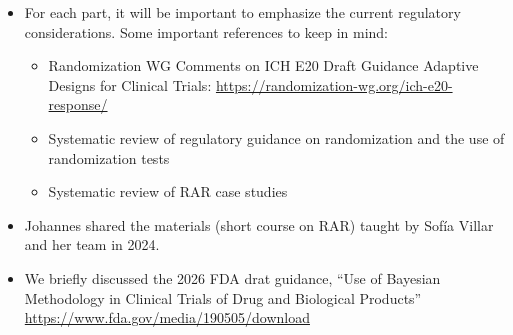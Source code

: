 \documentclass[12pt]{article}
\begin{document}
\begin{itemize}
\begin{itemize}
        \item Johannes and Yevgen will co-lead the development of \textbf{Part 2:} Advanced Restricted Randomization for Multi-Arm and Platform Trials (Core Focus)
        \item Alex will lead the development of \textbf{Part 3:} Response-Adaptive Randomization (RAR): Suitability and Regulatory Landscape (Overview)
    \end{itemize}
    \item For each part, it will be important to emphasize the current regulatory considerations. Some important references to keep in mind:
    \begin{itemize}
        \item Randomization WG Comments on ICH E20 Draft Guidance Adaptive Designs for Clinical Trials: \href{https://randomization-wg.org/ich-e20-response/}{https://randomization-wg.org/ich-e20-response/}
        \item Systematic review of regulatory guidance on randomization and the use of randomization tests \citep{Carter:2024}
        \item Systematic review of RAR case studies \citep{Sverdlov:2025}
    \end{itemize}
    \item Johannes shared the materials (short course on RAR) taught by Sofía Villar and her team in 2024.
    \item We briefly discussed the 2026 FDA drat guidance, ``Use of Bayesian Methodology in Clinical Trials of Drug and Biological Products''\\
    
    \href{https://www.fda.gov/media/190505/download}{https://www.fda.gov/media/190505/download}\\
    

\end{itemize}
\end{document}
